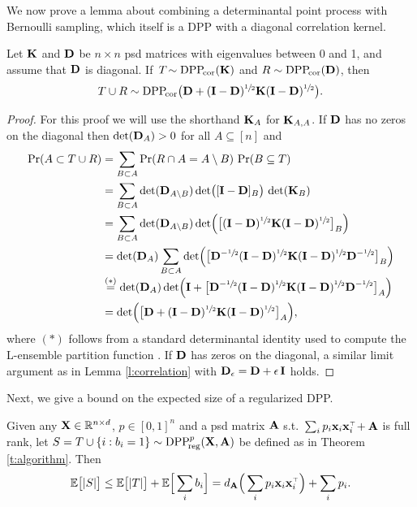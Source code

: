 \documentclass[11pt]{article}
\begin{document}
We now prove a lemma about combining a determinantal point process
with Bernoulli sampling, which itself is a DPP with a diagonal correlation
kernel.
\begin{lemma}
  Let $\mathbf K$ and $\mathbf D$ be $n\times n$ psd matrices with eigenvalues between
0 and 1, and assume that $\mathbf D$ is diagonal. If\, $T\!\sim{{\mathrm{DPP}}_{\!\mathrm{cor}}}(\mathbf K)$ and
$R\sim{{\mathrm{DPP}}_{\!\mathrm{cor}}}(\mathbf D)$, then
\begin{align*}T\cup R\sim {{\mathrm{DPP}}_{\!\mathrm{cor}}}\big(\mathbf D+(\mathbf I-\mathbf D)^{\sfrac12}\mathbf K
  (\mathbf I-\mathbf D)^{\sfrac12}\big).
  \end{align*}
\end{lemma}
\begin{proof}
For this proof we will use the shorthand $\mathbf K_A$ for $\mathbf K_{A,A}$. If
$\mathbf D$ has no zeros on the diagonal then $\det(\mathbf D_A)>0$ for all
$A\subseteq[n]$ and
  \begin{align*}
    \mathrm{Pr}(A \subset T \cup R)
    &=\sum_{B\subset A}\mathrm{Pr}(R\cap A=A\setminus B) \ \mathrm{Pr}(B\subseteq T)\\
    &=\sum_{B\subset A}\det(\mathbf D_{A\setminus
      B})\det\!\big([\mathbf I-\mathbf D]_B\big)\,\det(\mathbf K_B) \\
    &=\sum_{B\subset A}\det(\mathbf D_{A\setminus
      B})\det\!\Big(\big[(\mathbf I-\mathbf D)^{\sfrac12}\mathbf K(\mathbf I-\mathbf D)^{\sfrac12}\big]_B\Big) \\
    &=\det(\mathbf D_A) \sum_{B\subset A}\det\!\Big(\big[\mathbf D^{-\sfrac12}
      (\mathbf I-\mathbf D)^{\sfrac12}\mathbf K(\mathbf I-\mathbf D)^{\sfrac12}\mathbf D^{-\sfrac12}\big]_{B}\Big)\\[-1mm]
    &\overset{(*)}{=}\det(\mathbf D_A)\det\!\Big(\mathbf I + \big[\mathbf D^{-\sfrac12}
      (\mathbf I-\mathbf D)^{\sfrac12}\mathbf K(\mathbf I-\mathbf D)^{\sfrac12}\mathbf D^{-\sfrac12}\big]_A\Big)\\
    &=\det\!\Big(\big[\mathbf D+ (\mathbf I-\mathbf D)^{\sfrac12}\mathbf K(\mathbf I-\mathbf D)^{\sfrac12}\big]_A\Big),
  \end{align*}
  where $(*)$ follows from a standard determinantal identity used to
  compute the L-ensemble partition function
  \cite[Theorem~2.1]{dpp-ml}. If $\mathbf D$ has zeros on the diagonal, a
  similar limit argument as in Lemma \ref{l:correlation} with
  $\mathbf D_\epsilon=\mathbf D+\epsilon\,\mathbf I$ holds.
\end{proof}
Next, we give a bound on the expected size of a regularized DPP.
\begin{lemma}
  Given any $\mathbf X\in\mathbb R^{n\times d}$, $p\in[0,1]^n$ and a psd matrix $\mathbf A$
  s.t.~$\sum_ip_i\x_i\x_i^\top\!+\A$ is
  full rank, let $S=T\cup \{i:b_i=1\}\sim {{\mathrm{DPP}}_{\!\mathrm{reg}}^{p}}(\mathbf X,\mathbf A)$ be defined
as in Theorem \ref{t:algorithm}. Then
\begin{align*}
\E\big[|S|\big]\leq \E\big[|T|\big] + \E\Big[\sum_i b_i\Big] =
  d_{\A}\Big(\sum_ip_i\x_i\x_i^\top\Big) + \sum_i  p_i.
\end{align*}
\end{lemma}
\end{document}
